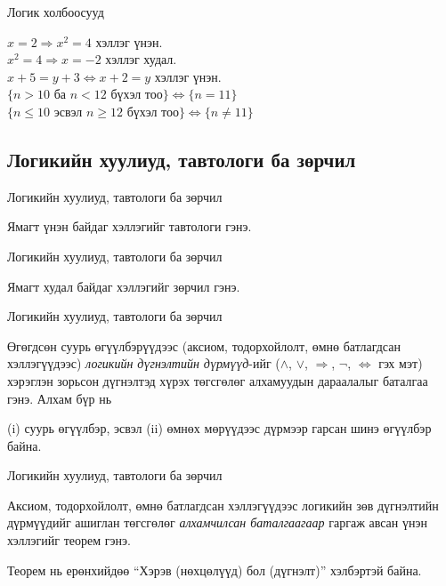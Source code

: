 \begin{frame}[allowframebreaks]{Логик холбоосууд}
\begin{example}
$x=2\Rightarrow x^2=4$ хэллэг үнэн.\\
$x^2=4\Rightarrow x=-2$ хэллэг худал.\\
$x+5=y+3\Leftrightarrow x+2=y$ хэллэг үнэн. \\
$\{n>10$ ба $n<12 {\text{ бүхэл тоо}}\}\Leftrightarrow \{n=11\}$\\
$\{n\leq 10$ эсвэл $n\geq 12 {\text{ бүхэл тоо}}\}\Leftrightarrow \{n\neq 11\}$\\
\end{example}
\end{frame}

\subsection{Логикийн хуулиуд, тавтологи ба зөрчил}
\begin{frame}[allowframebreaks]{Логикийн хуулиуд, тавтологи ба зөрчил}
\begin{definition}[Тавтологи] Ямагт үнэн байдаг хэллэгийг тавтологи гэнэ.
\end{definition}
\end{frame}

\begin{frame}[allowframebreaks]{Логикийн хуулиуд, тавтологи ба зөрчил}
\begin{definition}[Зөрчил]
    Ямагт худал байдаг хэллэгийг зөрчил гэнэ.
\end{definition}
\end{frame}

\begin{frame}[allowframebreaks]{Логикийн хуулиуд, тавтологи ба зөрчил}
\begin{definition}[Баталгаа]
Өгөгдсөн суурь өгүүлбэрүүдээс (аксиом, тодорхойлолт, өмнө батлагдсан хэллэгүүдээс) \emph{логикийн дүгнэлтийн дүрмүүд}-ийг ($\land$, $\lor$, $\Rightarrow$, $\lnot$, $\Leftrightarrow$ гэх мэт) хэрэглэн зорьсон дүгнэлтэд хүрэх төгсгөлөг алхамуудын дараалалыг баталгаа гэнэ. Алхам бүр нь 

(i) суурь өгүүлбэр, эсвэл 
(ii) өмнөх мөрүүдээс дүрмээр гарсан шинэ өгүүлбэр байна.
\end{definition}
\end{frame}

\begin{frame}[allowframebreaks]{Логикийн хуулиуд, тавтологи ба зөрчил}
\begin{definition}[Tеорем]
Аксиом, тодорхойлолт, өмнө батлагдсан хэллэгүүдээс логикийн зөв дүгнэлтийн дүрмүүдийг ашиглан төгсгөлөг \emph{алхамчилсан баталгаагаар} гаргаж авсан үнэн хэллэгийг теорем гэнэ.
\end{definition}
 Теорем нь ерөнхийдөө “Хэрэв (нөхцөлүүд) бол (дүгнэлт)” хэлбэртэй байна.
\end{frame}

